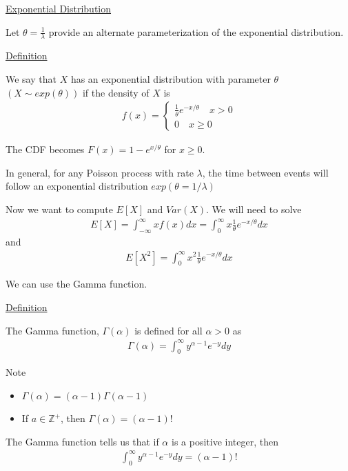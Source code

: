\documentclass{article}
\begin{document}
\underline{Exponential Distribution}

Let $\theta = \frac{1}{\lambda}$ provide an alternate parameterization of the exponential distribution. 

\underline{Definition}

We say that $X$ has an exponential distribution with parameter $\theta$ $(X \sim exp(\theta))$ if the density of $X$ is
\begin{align*}
    f(x) = \begin{cases}
        \frac{1}{\theta}e^{-x/\theta} \quad x > 0 \\
        0 \quad x \ge 0
    \end{cases}
\end{align*}

The CDF becomes $F(x) = 1 - e^{x/\theta}$ for $x \ge 0$.

In general, for any Poisson process with rate $\lambda$, the time between events will follow an exponential distribution $exp(\theta = 1/\lambda)$

Now we want to compute $E[X]$ and $Var(X)$. We will need to solve
\begin{align*}
    E[X] = \int_{-\infty}^{\infty}xf(x)dx = \int_0^{\infty}x \frac{1}{\theta}e^{-x/\theta}dx
\end{align*}
and
\begin{align*}
    E[X^2] = \int_0^{\infty}x^2\frac{1}{\theta}e^{-x/\theta}dx
\end{align*}

We can use the Gamma function. 

\underline{Definition}

The Gamma function, $\Gamma(\alpha)$ is defined for all $\alpha > 0$ as 
\begin{align*}
    \Gamma(\alpha) = \int_0^{\infty}y^{\alpha - 1} e^{-y}dy
\end{align*}

Note
\begin{itemize}
    \item $\Gamma(\alpha) = (\alpha -1)\Gamma(\alpha -1)$
    \item If $a \in \mathbb{Z}^+$, then $\Gamma(\alpha) = (\alpha - 1)!$
\end{itemize}

The Gamma function tells us that if $\alpha$ is a positive integer, then
\begin{align*}
    \int_0^{\infty}y^{\alpha -1}e^{-y}dy = (\alpha -1)!
\end{align*}
\end{document}
